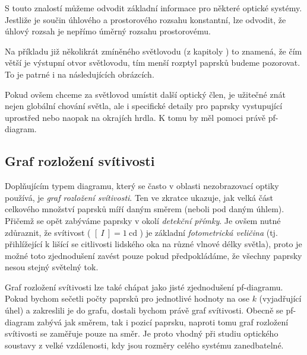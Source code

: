 S touto znalostí můžeme odvodit základní informace pro některé optické systémy. Jestliže je součin úhlového a prostorového rozsahu konstantní, lze odvodit, že úhlový rozsah je nepřímo úměrný rozsahu prostorovému. 

Na příkladu již několikrát zmíněného světlovodu (z kapitoly ) to znamená, že čím větší je výstupní otvor světlovodu, tím menší rozptyl paprsků budeme pozorovat. To je patrné i na následujících obrázcích.



Pokud ovšem chceme za světlovod umístit další optický člen, je užitečné znát nejen globální chování světla, ale i specifické detaily pro paprsky vystupující uprostřed nebo naopak na okrajích hrdla. K tomu by měl pomoci právě pf-diagram.


\subsection{Graf rozložení svítivosti}

Doplňujícím typem diagramu, který se často v oblasti nezobrazovací optiky používá, je \emph{graf rozložení svítivosti}. Ten ve zkratce ukazuje, jak velká část celkového množství paprsků míří daným směrem (neboli pod daným úhlem). Přičemž se opět zabýváme paprsky v okolí \emph{detekční přímky}. Je ovšem nutné zdůraznit, že svítivost ( $[\ I\ ] = 1\ \mathrm{cd}$ ) je základní \emph{fotometrická veličina} (tj. přihlížející k lišící se citlivosti lidského oka na různé vlnové délky světla), proto je možné toto zjednodušení zavést pouze pokud předpokládáme, že všechny paprsky nesou stejný světelný tok.

Graf rozložení svítivosti lze také chápat jako jisté zjednodušení pf-diagramu. Pokud bychom sečetli počty paprsků pro jednotlivé hodnoty na ose $k$ (vyjadřující úhel) a zakreslili je do grafu, dostali bychom právě graf svítivosti. Obecně se pf-diagram zabývá jak směrem, tak i pozicí paprsku, naproti tomu graf rozložení svítivosti se zaměřuje pouze na směr. Je proto vhodný při studiu optického soustavy z velké vzdálenosti, kdy jsou rozměry celého systému zanedbatelné.

